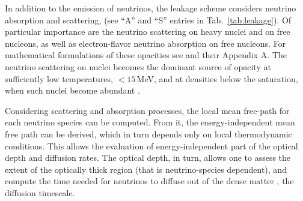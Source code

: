 In addition to the emission of neutrinos, the leakage scheme considers neutrino absorption 
and scattering, (see ``A'' and ``S'' entries in Tab.~\ref{tab:leakage}).
%
Of particular importance are the neutrino scattering on heavy nuclei and on free nucleons, 
as well as electron-flavor neutrino absorption on free nucleons. 
For mathematical formulations of these opacities see \citet{Galeazzi:2013mia} 
and their Appendix A.
%
The neutrino scattering on nuclei becomes the dominant source of opacity 
at sufficiently low temperatures, $<15\,$MeV, and at densities below 
the saturation, when such nuclei become abundant \citep{Rosswog:2003rv}.

Considering scattering and absorption processes, the local mean 
free-path for each neutrino species can be computed. From it, the 
energy-independent mean free path can be derived, which in turn depends 
only on local thermodynamic conditions. This allows the evaluation of energy-independent part of the optical depth and diffusion rates.
%
The optical depth, in turn, allows one to assess the extent of the optically thick region 
(that is neutrino-species dependent), and compute the time needed 
for neutrinos to diffuse out of the dense matter \ie, the diffusion timescale. 
%

%

